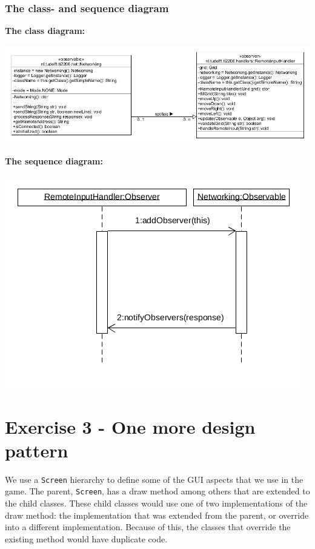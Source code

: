 \documentclass[a4paper,11pt,report]{scrartcl}
\begin{document}
\newpage\subsubsection{The class- and sequence diagram}
\textbf{The class diagram:}\\
\centerline{\includegraphics[scale=0.5]{sources/ObserverUML}}

\textbf{The sequence diagram:}\\
\centerline{\includegraphics[scale=1.0]{sources/ObserverSequence}}

\newpage\section{Exercise 3 - One more design pattern}
We use a \texttt{Screen} hierarchy to define some of the GUI aspects that we use in the
game. The parent, \texttt{Screen}, has a draw method among others that are extended
to the child classes. These child classes would use one of two implementations
of the draw method: the implementation that was extended from the parent, or
override into a different implementation. Because of this, the classes that
override the existing method would have duplicate code.\\
\end{document}
